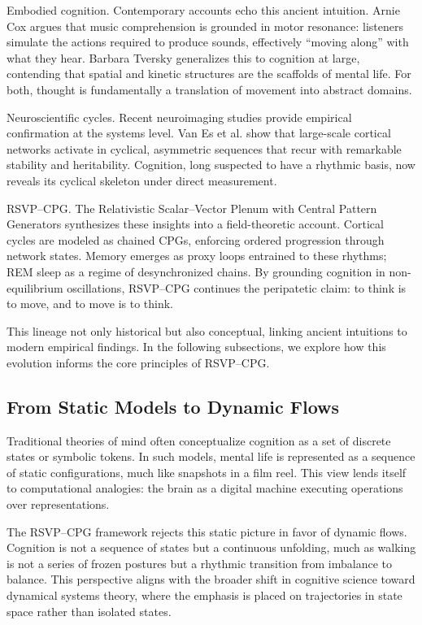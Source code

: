 \documentclass{article}
\begin{document}
Embodied cognition. Contemporary accounts echo this ancient intuition. Arnie Cox \citep{cox2016music} argues that music comprehension is grounded in motor resonance: listeners simulate the actions required to produce sounds, effectively “moving along” with what they hear. Barbara Tversky \citep{tversky2019mind} generalizes this to cognition at large, contending that spatial and kinetic structures are the scaffolds of mental life. For both, thought is fundamentally a translation of movement into abstract domains.

Neuroscientific cycles. Recent neuroimaging studies provide empirical confirmation at the systems level. Van Es et al. \citep{van2025cortical} show that large-scale cortical networks activate in cyclical, asymmetric sequences that recur with remarkable stability and heritability. Cognition, long suspected to have a rhythmic basis, now reveals its cyclical skeleton under direct measurement.

RSVP--CPG. The Relativistic Scalar–Vector Plenum with Central Pattern Generators synthesizes these insights into a field-theoretic account. Cortical cycles are modeled as chained CPGs, enforcing ordered progression through network states. Memory emerges as proxy loops entrained to these rhythms; REM sleep as a regime of desynchronized chains. By grounding cognition in non-equilibrium oscillations, RSVP--CPG continues the peripatetic claim: to think is to move, and to move is to think.

This lineage not only historical but also conceptual, linking ancient intuitions to modern empirical findings. In the following subsections, we explore how this evolution informs the core principles of RSVP--CPG.

\subsection{From Static Models to Dynamic Flows}

Traditional theories of mind often conceptualize cognition as a set of discrete states or symbolic tokens. In such models, mental life is represented as a sequence of static configurations, much like snapshots in a film reel. This view lends itself to computational analogies: the brain as a digital machine executing operations over representations.

The RSVP--CPG framework rejects this static picture in favor of dynamic flows. Cognition is not a sequence of states but a continuous unfolding, much as walking is not a series of frozen postures but a rhythmic transition from imbalance to balance. This perspective aligns with the broader shift in cognitive science toward dynamical systems theory, where the emphasis is placed on trajectories in state space rather than isolated states.
\end{document}
